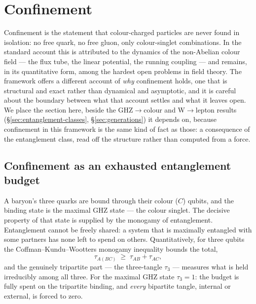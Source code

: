 \section{Confinement}
\label{sec:confinement}

Confinement is the statement that colour-charged particles are never found in isolation: no free
quark, no free gluon, only colour-singlet combinations. In the standard account this is attributed
to the dynamics of the non-Abelian colour field --- the flux tube, the linear potential, the running
coupling --- and remains, in its quantitative form, among the hardest open problems in field theory.
The framework offers a different account of \emph{why} confinement holds, one that is structural and
exact rather than dynamical and asymptotic, and it is careful about the boundary between what that
account settles and what it leaves open. We place the section here, beside the GHZ$\to$colour and
W$\to$lepton results (\S\ref{sec:entanglement-classes}, \S\ref{sec:generations}) it depends on,
because confinement in this framework is the same kind of fact as those: a consequence of the
entanglement class, read off the structure rather than computed from a force.

\subsection{Confinement as an exhausted entanglement budget}

A baryon's three quarks are bound through their colour ($C$) qubits, and the binding state is the
maximal GHZ state --- the colour singlet. The decisive property of that state is supplied by the
monogamy of entanglement. Entanglement cannot be freely shared: a system that is maximally entangled
with some partners has none left to spend on others. Quantitatively, for three qubits the
Coffman--Kundu--Wootters monogamy inequality
\autocite{coffmankunduwootters2000distributed,OsborneVerstraete2006} bounds the total,
\begin{equation}
  \tau_{A(BC)} \;\ge\; \tau_{AB} + \tau_{AC},
\end{equation}
and the genuinely tripartite part --- the three-tangle $\tau_3$ --- measures what is held
irreducibly among all three. For the maximal GHZ state $\tau_3 = 1$: the budget is fully spent on
the tripartite binding, and \emph{every} bipartite tangle, internal or external, is forced to zero.

